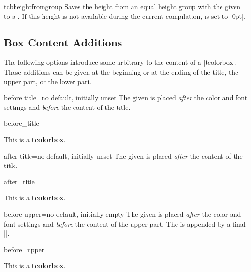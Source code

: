 \begin{docCommand}[doc new=2015-11-27]{tcbheightfromgroup}{}
  Saves the height from an equal height group with the given 
  to a . If this height is not available during the current compilation,
   is set to |0pt|.
\end{docCommand}


\clearpage
\subsection{Box Content Additions}\label{subsec:contentadditions}
The following options introduce some arbitrary  to the content
of a |tcolorbox|. These additions can be given at the beginning or at the ending
of the title, the upper part, or the lower part.

\begin{docTcbKey}{before title}{=}{no default, initially unset}
  The given  is placed \emph{after} the color and font settings
  and \emph{before} the content of the title.
\begin{exdispExample}{before_title}

\begin{tcolorbox}[title=My title]
This is a \textbf{tcolorbox}.
\end{tcolorbox}
\end{exdispExample}
\end{docTcbKey}


\begin{docTcbKey}{after title}{=}{no default, initially unset}
  The given  is placed \emph{after} the content of the title.
\begin{exdispExample}{after_title}

\begin{tcolorbox}[title=My title]
This is a \textbf{tcolorbox}.
\end{tcolorbox}
\end{exdispExample}
\end{docTcbKey}


\clearpage
\begin{docTcbKey}{before upper}{=}{no default, initially empty}
  The given  is placed \emph{after} the color and font settings
  and \emph{before} the content of the upper part.
  The  is appended by a final |\ignorespaces|.
\begin{exdispExample}{before_upper}

\begin{tcolorbox}[title=My title]
This is a \textbf{tcolorbox}.
\end{tcolorbox}
\end{exdispExample}
\end{docTcbKey}


